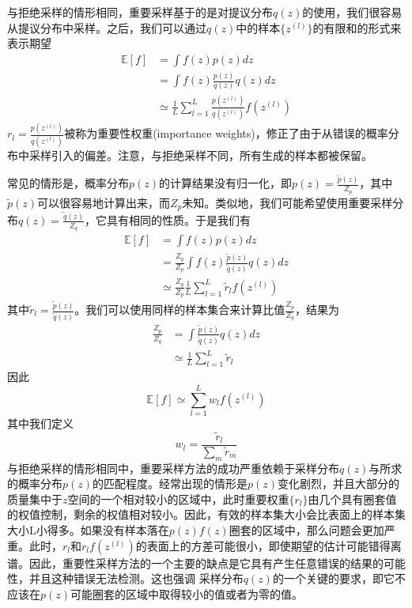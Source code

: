 与拒绝采样的情形相同，重要采样基于的是对提议分布$q(z)$的使用，我们很容易从提议分布中采样。之后，我们可以通过$q(z)$中的样本$\{z^{(l)} \}$的有限和的形式来表示期望
\begin{equation}
	\begin{aligned}
		\mathbb{E}[f]&=\int f(z)p(z)dz\\
		&=\int f(z) \frac{p(z)}{q(z)}q(z)dz\\
		&\simeq \frac{1}{L}\sum_{l=1}^{L}\frac{p(z^{(l)})}{q(z^{(l)})}f(z^{(l)})
	\end{aligned}
\end{equation}
$r_l=\frac{p(z^{(l)})}{q(z^{(l)})}$被称为重要性权重(importance weights)，修正了由于从错误的概率分布中采样引入的偏差。注意，与拒绝采样不同，所有生成的样本都被保留。

常见的情形是，概率分布$p(z)$的计算结果没有归一化，即$p(z)=\frac{\tilde{p}(z)}{Z_p}$，其中$\tilde{p}(z)$可以很容易地计算出来，而$Z_p$未知。类似地，我们可能希望使用重要采样分布$q(z)=\frac{\tilde{q}(z)}{Z_q}$，它具有相同的性质。于是我们有
\begin{equation}
	\begin{aligned}
		\mathbb{E}[f]&=\int f(z)p(z)dz\\
		&=\frac{Z_q}{Z_p}\int f(z)\frac{\tilde{p}(z)}{\tilde{q}(z)}q(z)dz\\
		&\simeq \frac{Z_q}{Z_p}\frac{1}{L}\sum_{l=1}^{L}\tilde{r}_l f(z^{(l)})
	\end{aligned}
\end{equation}
其中$\tilde{r}_l=\frac{\tilde{p}(z)}{\tilde{q}(z)}$。我们可以使用同样的样本集合来计算比值$\frac{Z_p}{Z_q}$，结果为
\begin{equation}
	\begin{aligned}
		\frac{Z_p}{Z_q}&=\int \frac{\tilde{p}(z)}{\tilde{q}(z)}q(z)dz\\
		&\simeq \frac{1}{L}\sum_{l=1}^{L}\tilde{r}_l
	\end{aligned}
\end{equation}
因此
\begin{equation}
	\mathbb{E}[f]\simeq \sum_{l=1}^{L}w_lf(z^{(l)})
\end{equation}
其中我们定义
\begin{equation}
	w_l=\frac{\tilde{r}_l}{\sum_m \tilde{r}_m}
\end{equation}
与拒绝采样的情形相同中，重要采样方法的成功严重依赖于采样分布$q(z)$与所求的概率分布$p(z)$的匹配程度。经常出现的情形是$p(z)$变化剧烈，并且大部分的质量集中于$z$空间的一个相对较小的区域中，此时重要权重$\{r_l\}$由几个具有圈套值的权值控制，剩余的权值相对较小。因此，有效的样本集大小会比表面上的样本集大小L小得多。如果没有样本落在$p(z)f(z)$圈套的区域中，那么问题会更加严重。此时，$r_l$和$r_lf(z^{(l)})$的表面上的方差可能很小，即使期望的估计可能错得离谱。因此，重要性采样方法的一个主要的缺点是它具有产生任意错误的结果的可能性，并且这种错误无法检测。这也强调 采样分布$q(z)$的一个关键的要求，即它不应该在$p(z)$可能圈套的区域中取得较小的值或者为零的值。
